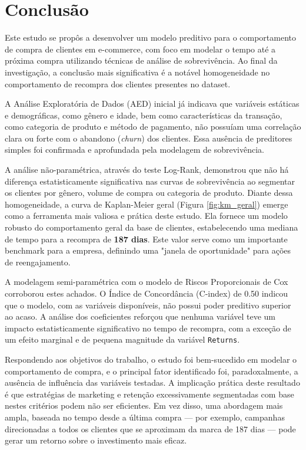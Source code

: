 \section{Conclusão}

Este estudo se propôs a desenvolver um modelo preditivo para o comportamento de compra de clientes em e-commerce, com foco em modelar o tempo até a próxima compra utilizando técnicas de análise de sobrevivência. Ao final da investigação, a conclusão mais significativa é a notável homogeneidade no comportamento de recompra dos clientes presentes no dataset.

A Análise Exploratória de Dados (AED) inicial já indicava que variáveis estáticas e demográficas, como gênero e idade, bem como características da transação, como categoria de produto e método de pagamento, não possuíam uma correlação clara ou forte com o abandono (\textit{churn}) dos clientes. Essa ausência de preditores simples foi confirmada e aprofundada pela modelagem de sobrevivência.

A análise não-paramétrica, através do teste Log-Rank, demonstrou que não há diferença estatisticamente significativa nas curvas de sobrevivência ao segmentar os clientes por gênero, volume de compra ou categoria de produto. Diante dessa homogeneidade, a curva de Kaplan-Meier geral (Figura \ref{fig:km_geral}) emerge como a ferramenta mais valiosa e prática deste estudo. Ela fornece um modelo robusto do comportamento geral da base de clientes, estabelecendo uma mediana de tempo para a recompra de \textbf{187 dias}. Este valor serve como um importante benchmark para a empresa, definindo uma "janela de oportunidade" para ações de reengajamento.

A modelagem semi-paramétrica com o modelo de Riscos Proporcionais de Cox corroborou estes achados. O Índice de Concordância (C-index) de 0.50 indicou que o modelo, com as variáveis disponíveis, não possui poder preditivo superior ao acaso. A análise dos coeficientes reforçou que nenhuma variável teve um impacto estatisticamente significativo no tempo de recompra, com a exceção de um efeito marginal e de pequena magnitude da variável \texttt{Returns}.

Respondendo aos objetivos do trabalho, o estudo foi bem-sucedido em modelar o comportamento de compra, e o principal fator identificado foi, paradoxalmente, a ausência de influência das variáveis testadas. A implicação prática deste resultado é que estratégias de marketing e retenção excessivamente segmentadas com base nestes critérios podem não ser eficientes. Em vez disso, uma abordagem mais ampla, baseada no tempo desde a última compra — por exemplo, campanhas direcionadas a todos os clientes que se aproximam da marca de 187 dias — pode gerar um retorno sobre o investimento mais eficaz.

